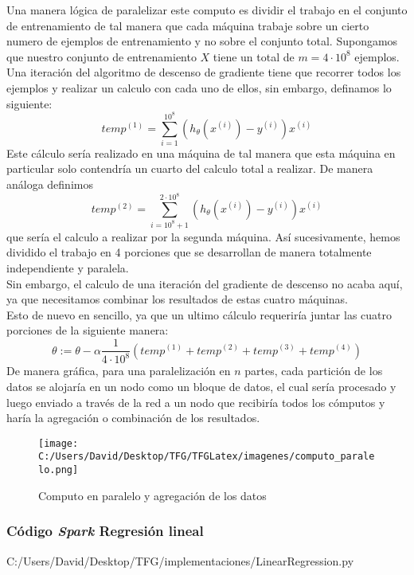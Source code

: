 \clearpage

Una manera lógica de paralelizar este computo es dividir el trabajo en el conjunto de entrenamiento 
de tal manera que cada máquina trabaje sobre un cierto numero de ejemplos de entrenamiento y no 
sobre el conjunto total.
Supongamos que nuestro conjunto de entrenamiento $X$ tiene un total de $m=4 \cdot 10^8$ ejemplos.
Una iteración del algoritmo de descenso de gradiente tiene que recorrer todos los ejemplos y realizar 
un calculo con cada uno de ellos, sin embargo, definamos lo siguiente:
$$ temp^{(1)} = \sum_{i=1}^{10^8}(h_{\theta}(x^{(i)}) - y^{(i)})x^{(i)} $$
Este cálculo sería realizado en una máquina de tal manera que esta máquina en particular solo contendría 
un cuarto del calculo total a realizar. De manera análoga definimos
$$ temp^{(2)} = \sum_{i=10^8+1}^{2 \cdot 10^8}(h_{\theta}(x^{(i)}) - y^{(i)})x^{(i)} $$
que sería el calculo a realizar por la segunda máquina.
Así sucesivamente, hemos dividido el trabajo en 4 porciones que se desarrollan de manera totalmente 
independiente y paralela.\\
Sin embargo, el calculo de una iteración del gradiente de descenso no 
acaba aquí, ya que necesitamos combinar los resultados de estas cuatro máquinas.\\
Esto de nuevo en sencillo, ya que un ultimo cálculo requeriría juntar las cuatro porciones de la 
siguiente manera:
$$ \theta := \theta - \alpha \frac{1}{4 \cdot 10^8}(temp^{(1)} + temp^{(2)} + temp^{(3)} + temp^{(4)}) $$
De manera gráfica, para una paralelización en $n$ partes, cada partición de los datos se alojaría en un nodo
como un bloque de datos, el cual sería procesado y luego enviado a través de la red a un nodo que recibiría
todos los cómputos y haría la agregación o combinación de los resultados.

\begin{figure}[h]
  \centering
  \texttt{[image: C:/Users/David/Desktop/TFG/TFGLatex/imagenes/computo\_paralelo.png]}
  \caption[División de los datos en el gradiente de descenso]
          {Computo en paralelo y agregación de los datos}
  \label{computo_paralelo}
\end{figure}

\newpage

\subsubsection*{Código \textit{Spark} Regresión lineal}

                {C:/Users/David/Desktop/TFG/implementaciones/LinearRegression.py}

